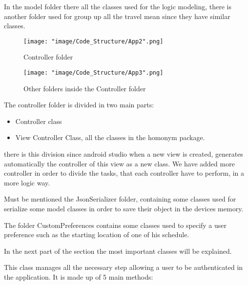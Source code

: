 In the model folder there all the classes used for the logic modeling, there is another folder used for group up all the travel mean since they have similar classes.

\begin{figure}[H]
\begin{center}
\texttt{[image: "image/Code\_Structure/App2".png]}
\caption{Controller folder}
\end{center}
\end{figure}

\begin{figure}[H]
\begin{center}
\texttt{[image: "image/Code\_Structure/App3".png]}
\caption{Other folders inside the Controller folder}
\end{center}
\end{figure}

The controller folder is divided in two main parts:
\begin{itemize}
\item Controller class
\item View Controller Class, all the classes in the homonym package.
\end{itemize}

there is this division since android studio when a new view is created, generates automatically the controller of this view as a new class. We have added more controller in order to divide the tasks, that each controller have to perform, in a more logic way.

Must be mentioned the JsonSerializer folder, containing some classes used for serialize some model classes in order to save their object in the devices memory.

The folder CustomPreferences contains some classes used to specify a user preference such as the starting location of one of his schedule.


In the next part of the section the most important classes will be explained.

This class manages all the necessary step allowing a user to be authenticated in the application. It is made up of 5 main methods:

